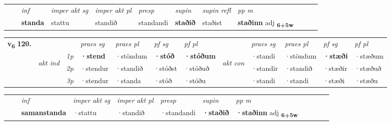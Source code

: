\begin{tabular}{llllllllllll}
 & & \textit{inf} & \textit{imper akt sg} & \textit{imper akt pl}   & \textit{presp} & \textit{supin} & \textit{supin refl} & \textit{pp m}     \\*
  & & \textbf{standa} & stattu  & standið   & standandi &  \textbf{staðið} & staðist & \textbf{staðinn} adj \textbf{\textsubscript{6+5w}} \\*
\cmidrule{1-12}
\end{tabular}



\begin{tabular}{llllllllllll} \toprule
\multirow{4}{*}{{{\textbf{v{\textsubscript{6}}} \Large{\textbf{120.}}}}}  & &   &  \textit{praes sg}  & \textit{praes pl}  &\textit{ pf sg} & \textit{pf pl} &  &  \textit{praes sg}  & \textit{praes pl}  & \textit{pf sg} & \textit{pf pl } \\*
	\cmidrule{4-7} \cmidrule{9-12}
 & \multirow{3}{*}{\begin{turn}{90}\textit{akt ind}\end{turn}} & {\textit{1p}} & \textbf{·stend} & ·stöndum    & \textbf{·stóð} & \textbf{·stóðum} & \multirow{3}{*}{\begin{turn}{90}\textit{akt con}\end{turn}} &·standi & ·stöndum & \textbf{·stæði} & ·stæðum\\*
& &  {\textit{2p}} &  ·stendur  & ·standið   & ·stóðst & ·stóðuð & & ·standir & ·standið & ·stæðir & ·stæðuð \\*
& &  {\textit{3p}} & ·stendur & ·standa   & ·stóð & ·stóðu & & ·standi & ·standi& ·stæði & ·stæðu  \\*
\cmidrule{4-7} \cmidrule{9-12}
\end{tabular}


\begin{tabular}{llllllllllll}
 & & \textit{inf} & \textit{imper akt sg} & \textit{imper akt pl}   & \textit{presp} & \textit{supin}  & \textit{pp m}     \\*
  & & \textbf{samanstanda} & ·stattu  & ·standið   & ·standandi &  \textbf{·staðið}  & \textbf{·staðinn} adj \textbf{\textsubscript{6+5w}} \\*
\cmidrule{1-12}
\end{tabular}



